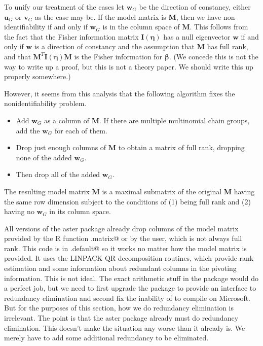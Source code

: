 \documentclass[11pt]{article}
\newcommand{\boldbeta}{\boldsymbol{\beta}}
\newcommand{\boldeta}{\boldsymbol{\eta}}
\newcommand{\boldI}{\mathbf{I}}
\newcommand{\boldM}{\mathbf{M}}
\newcommand{\boldu}{\mathbf{u}}
\newcommand{\boldv}{\mathbf{v}}
\newcommand{\boldw}{\mathbf{w}}
\begin{document}
To unify our treatment of the cases let $\boldw_G$ be the direction of
constancy, either $\boldu_G$ or $\boldv_G$ as the case may be.  If the model
matrix is $\boldM$, then we have non-identifiability if and only if
$\boldw_G$ is in the column space of $\boldM$.  This follows from the
fact that the Fisher information matrix $\boldI(\boldeta)$ has a null
eigenvector
$\boldw$ if and only if $\boldw$ is a direction of constancy and
the assumption that $\boldM$ has full rank, and that
$\boldM^T \boldI(\boldeta) \boldM$ is the Fisher information for
$\boldbeta$.
(We concede this is not the way to write up a proof, but this is not
a theory paper.  We should write this up properly somewhere.)

However, it seems from this analysis that the following algorithm
fixes the nonidentifiability problem.
\begin{itemize}
\item Add $\boldw_G$ as a column of $\boldM$.  If there are multiple
    multinomial chain groups, add the $\boldw_G$ for each of them.
\item Drop just enough columns of $\boldM$ to obtain a matrix
    of full rank, dropping none of the added $\boldw_G$.
\item Then drop all of the added $\boldw_G$.
\end{itemize}
The resulting model matrix $\boldM$ is a maximal submatrix of the original
$\boldM$ having the same row dimension subject to the conditions of (1)
being full rank and (2) having no $\boldw_G$ in its column space.

All versions of the aster package already drop columns of the model matrix
provided by the R function \verb@model.matrix@ or by the user, which is not
always full rank.
This code is in \verb@aster.default@ so it works no matter how the model
matrix is provided.  It uses the LINPACK QR decomposition routines, which
provide rank estimation and some information about redundant columns in
the pivoting information.  This is not ideal.  The exact arithmetic stuff
in the \verb@rcdd@ package would do a perfect job, but we need to first
upgrade the \verb@rcdd@ package to provide an interface to redundancy
elimination and second fix the inability of \verb@cddlib@ to compile
on Microsoft.  But for the purposes of this section, how we do redundancy
elimination is irrelevant.  The point is that the aster package already
must do redundancy elimination.  This doesn't make the situation any worse
than it already is.  We merely have to add some additional redundancy to
be eliminated.
\end{document}
